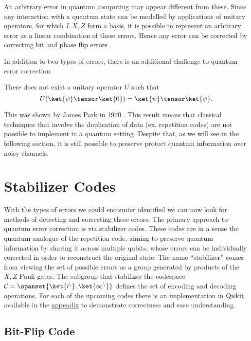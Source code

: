 \documentclass{article}
\begin{document}
        An arbitrary error in quantum computing may appear different from these.
        Since any interaction with a quantum state can be modelled by applications of unitary operators, for which $I, X, Z$ form a basis, it is possible to represent an arbitrary error as a linear combination of these errors.
        Hence any error can be corrected by correcting bit and phase flip errors \cite{Nielsen}.

        In addition to two types of errors, there is an additional challenge to quantum error correction.
        \begin{theorem}
                There does not exist a unitary operator $U$ such that
                        $$U (\ket{\psi} \tensor \ket{0}) = \ket{\psi} \tensor \ket{\psi}.$$
        \end{theorem}
        This was shown by James Park in 1970 \cite{Park}.
        This result means that classical techniques that involve the duplication of data (ex. repetition codes) are not possible to implement in a quantum setting.
        Despite that, as we will see in the following section, it is still possible to preserve protect quantum information over noisy channels.


\section{Stabilizer Codes}

        With the types of errors we could encounter identified we can now look for methods of detecting and correcting these errors.
        The primary approach to quantum error correction is via stabilizer codes.
        These codes are in a sense the quantum analogue of the repetition code, aiming to preserve quantum information by sharing it across multiple qubits, whose errors can be individually corrected in order to reconstruct the original state.
        The name ``stabilizer'' comes from viewing the set of possible errors as a group generated by products of the $X, Z$ Pauli gates.
        The subgroup that stabilizes the codespace $\cal{C} = \spanset\{\ket{0^n}, \ket{1^n}\}$ defines the set of encoding and decoding operations.
        For each of the upcoming codes there is an implementation in Qiskit available in the \hyperref[appendix:gates]{appendix} to demonstrate correctness and ease understanding.

        \subsection{Bit-Flip Code}
\end{document}
